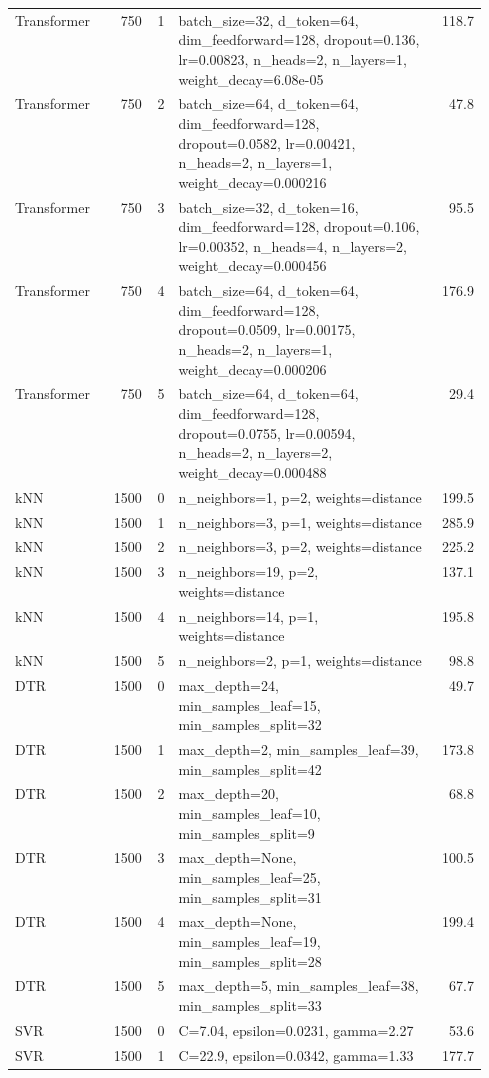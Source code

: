 \begin{longtable}{lrrp{0.55\linewidth}r}
Transformer & 750 & 1 & batch\_size=32, d\_token=64, dim\_feedforward=128, dropout=0.136, lr=0.00823, n\_heads=2, n\_layers=1, weight\_decay=6.08e-05 & 118.7 \\
Transformer & 750 & 2 & batch\_size=64, d\_token=64, dim\_feedforward=128, dropout=0.0582, lr=0.00421, n\_heads=2, n\_layers=1, weight\_decay=0.000216 & 47.8 \\
Transformer & 750 & 3 & batch\_size=32, d\_token=16, dim\_feedforward=128, dropout=0.106, lr=0.00352, n\_heads=4, n\_layers=2, weight\_decay=0.000456 & 95.5 \\
Transformer & 750 & 4 & batch\_size=64, d\_token=64, dim\_feedforward=128, dropout=0.0509, lr=0.00175, n\_heads=2, n\_layers=1, weight\_decay=0.000206 & 176.9 \\
Transformer & 750 & 5 & batch\_size=64, d\_token=64, dim\_feedforward=128, dropout=0.0755, lr=0.00594, n\_heads=2, n\_layers=2, weight\_decay=0.000488 & 29.4 \\
\midrule
kNN & 1500 & 0 & n\_neighbors=1, p=2, weights=distance & 199.5 \\
kNN & 1500 & 1 & n\_neighbors=3, p=1, weights=distance & 285.9 \\
kNN & 1500 & 2 & n\_neighbors=3, p=2, weights=distance & 225.2 \\
kNN & 1500 & 3 & n\_neighbors=19, p=2, weights=distance & 137.1 \\
kNN & 1500 & 4 & n\_neighbors=14, p=1, weights=distance & 195.8 \\
kNN & 1500 & 5 & n\_neighbors=2, p=1, weights=distance & 98.8 \\
DTR & 1500 & 0 & max\_depth=24, min\_samples\_leaf=15, min\_samples\_split=32 & 49.7 \\
DTR & 1500 & 1 & max\_depth=2, min\_samples\_leaf=39, min\_samples\_split=42 & 173.8 \\
DTR & 1500 & 2 & max\_depth=20, min\_samples\_leaf=10, min\_samples\_split=9 & 68.8 \\
DTR & 1500 & 3 & max\_depth=None, min\_samples\_leaf=25, min\_samples\_split=31 & 100.5 \\
DTR & 1500 & 4 & max\_depth=None, min\_samples\_leaf=19, min\_samples\_split=28 & 199.4 \\
DTR & 1500 & 5 & max\_depth=5, min\_samples\_leaf=38, min\_samples\_split=33 & 67.7 \\
SVR & 1500 & 0 & C=7.04, epsilon=0.0231, gamma=2.27 & 53.6 \\
SVR & 1500 & 1 & C=22.9, epsilon=0.0342, gamma=1.33 & 177.7 \\

\end{longtable}
